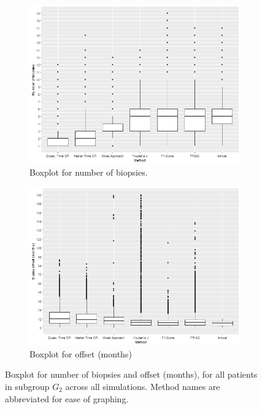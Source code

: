 \begin{figure}[!htb]
    \centering
    \captionsetup{justification=centering}
     \begin{subfigure}[b]{0.45\textwidth}
        \includegraphics[width=\textwidth]{images/sim_study/nbBoxPlot_scale_5.png}
        \caption{Boxplot for number of biopsies.}
        \label{fig : nbBoxPlot_G2}
    \end{subfigure}
    \begin{subfigure}[b]{0.45\textwidth}
        \includegraphics[width=\textwidth]{images/sim_study/offsetBoxPlot_scale_5.png}
        \caption{Boxplot for offset (months)}
        \label{fig : offsetBoxPlot_G2}
    \end{subfigure}      
    \caption{Boxplot for number of biopsies and offset (months), for all patients in subgroup $G_2$ across all simulations. Method names are abbreviated for ease of graphing.}
     \label{fig : nbAndOffsetBoxPlot_G2}
\end{figure}

